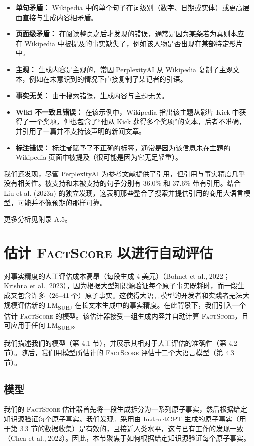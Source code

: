 \documentclass[11pt,UTF8,fontset=fandol]{ctexart}
\newcommand{\FS}{\textsc{FactScore}}
\newcommand{\subj}{LM\textsubscript{SUBJ}}
\begin{document}
\begin{itemize}[leftmargin=2em]
\item \textbf{单句矛盾：} Wikipedia 中的单个句子在词级别（数字、日期或实体）或更高层面直接与生成内容相矛盾。
\item \textbf{页面级矛盾：} 在阅读整页之后才发现的错误，通常是因为某条若为真则本应在 Wikipedia 中被提及的事实缺失了，例如该人物是否出现在某部特定影片中。
\item \textbf{主观：} 生成内容是主观的，常因 PerplexityAI 从 Wikipedia 复制了主观文本，例如在未意识到的情况下直接复制了某记者的引语。
\item \textbf{事实无关：} 由于搜索错误，生成内容与主题无关。
\item \textbf{Wiki 不一致且错误：} 在该示例中，Wikipedia 指出该主题从影片 Kick 中获得了一个奖项，但也包含了“他从 Kick 获得多个奖项”的文本，后者不准确，并引用了一篇并不支持该声明的新闻文章。
\item \textbf{标注错误：} 标注者赋予了不正确的标签，通常是因为该信息未在主题的 Wikipedia 页面中被提及（很可能是因为它无足轻重）。
\end{itemize}

我们还发现，尽管 PerplexityAI 为参考文献提供了引用，但引用与事实精度几乎没有相关性。被支持和未被支持的句子分别有 36.0\% 和 37.6\% 带有引用。结合 Liu et al. (2023a) 的独立发现，这表明那些整合了搜索并提供引用的商用大语言模型，可能并不像预期的那样可靠。

更多分析见附录 A.5。

\section{估计 \FS{} 以进行自动评估}

对事实精度的人工评估成本高昂（每段生成 4 美元）（Bohnet et al., 2022；Krishna et al., 2023），因为根据大型知识源验证每个原子事实既耗时，而一段生成又包含许多（26--41 个）原子事实。这使得大语言模型的开发者和实践者无法大规模评估新的 \subj{} 在长文本生成中的事实精度。在此背景下，我们引入一个估计 \FS{} 的模型。该估计器接受一组生成内容并自动计算 \FS，且可应用于任何 \subj。

我们描述我们的模型（第 4.1 节），并展示其相对于人工评估的准确性（第 4.2 节）。随后，我们用模型所估计的 \FS{} 评估十二个大语言模型（第 4.3 节）。

\subsection{模型}

我们的 \FS{} 估计器首先将一段生成拆分为一系列原子事实，然后根据给定知识源验证每个原子事实。我们发现，采用由 InstructGPT 生成的原子事实（用于第 3.3 节的数据收集）是有效的，且接近人类水平，这与已有工作的发现一致（Chen et al., 2022）。因此，本节聚焦于如何根据给定知识源验证每个原子事实。
\end{document}
